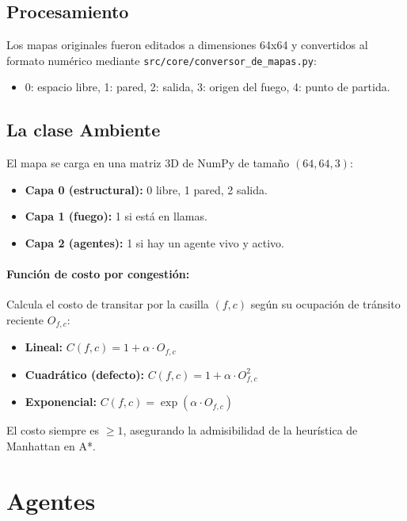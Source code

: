 \documentclass[11pt,a4paper]{article}
\begin{document}
\subsection{Procesamiento}
Los mapas originales fueron editados a dimensiones 64x64 y convertidos al formato numérico mediante \texttt{src/core/conversor\_de\_mapas.py}:
\begin{itemize}
    \item 0: espacio libre, 1: pared, 2: salida, 3: origen del fuego, 4: punto de partida.
\end{itemize}

\subsection{La clase Ambiente}
El mapa se carga en una matriz 3D de NumPy de tamaño $(64, 64, 3)$:
\begin{itemize}
    \item \textbf{Capa 0 (estructural):} 0 libre, 1 pared, 2 salida.
    \item \textbf{Capa 1 (fuego):} 1 si está en llamas.
    \item \textbf{Capa 2 (agentes):} 1 si hay un agente vivo y activo.
\end{itemize}

\paragraph{Función de costo por congestión:}
Calcula el costo de transitar por la casilla $(f, c)$ según su ocupación de tránsito reciente $O_{f,c}$:
\begin{itemize}
    \item \textbf{Lineal:} $C(f,c) = 1 + \alpha \cdot O_{f,c}$
    \item \textbf{Cuadrático (defecto):} $C(f,c) = 1 + \alpha \cdot O_{f,c}^2$
    \item \textbf{Exponencial:} $C(f,c) = \exp(\alpha \cdot O_{f,c})$
\end{itemize}
El costo siempre es $\ge 1$, asegurando la admisibilidad de la heurística de Manhattan en A*.

\section{Agentes}
\end{document}

